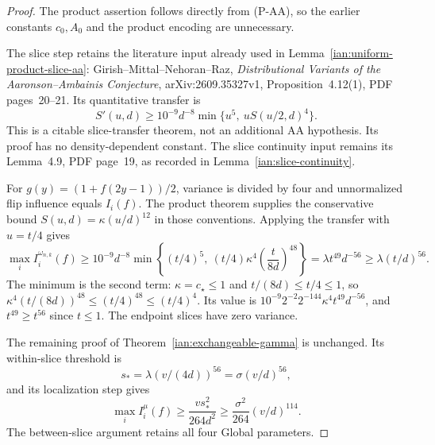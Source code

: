 \begin{proof}
The product assertion follows directly from (P-AA), so the earlier
constants \(c_0,A_0\) and the product encoding are unnecessary.

The slice step retains the literature input already used in
Lemma~\ref{ian:uniform-product-slice-aa}:
Girish--Mittal--Nehoran--Raz, \emph{Distributional Variants of the
Aaronson--Ambainis Conjecture}, arXiv:2609.35327v1,
Proposition~4.12(1), PDF pages~20--21.
Its quantitative transfer is
\[
 S'(u,d)\ge10^{-9}d^{-8}
             \min\{u^5,\ uS(u/2,d)^4\}.
\]
This is a citable slice-transfer theorem, not an additional AA
hypothesis. Its proof has no density-dependent constant.
The slice continuity input remains its Lemma~4.9, PDF page~19,
as recorded in Lemma~\ref{ian:slice-continuity}.

For \(g(y)=(1+f(2y-1))/2\), variance is divided by four and
unnormalized flip influence equals \(I_i(f)\).
The product theorem supplies the conservative bound
\(S(u,d)=\kappa(u/d)^{12}\) in those conventions. Applying the
transfer with \(u=t/4\) gives
\[
 \max_i I_i^{\omega_{n,k}}(f)
 \ge10^{-9}d^{-8}
 \min\left\{(t/4)^5,\
       (t/4)\kappa^4\left(\frac{t}{8d}\right)^{48}\right\}
 =\lambda t^{49}d^{-56}
 \ge\lambda(t/d)^{56}.
\]
The minimum is the second term: \(\kappa=c_\star\le1\) and
\(t/(8d)\le t/4\le1\), so
\(\kappa^4(t/(8d))^{48}\le(t/4)^{48}\le(t/4)^4\).
Its value is \(10^{-9}2^{-2}2^{-144}\kappa^4t^{49}d^{-56}\), and
\(t^{49}\ge t^{56}\) since \(t\le1\).
The endpoint slices have zero variance.

The remaining proof of Theorem~\ref{ian:exchangeable-gamma} is
unchanged. Its within-slice threshold is
\[
 s_*=\lambda(v/(4d))^{56}=\sigma(v/d)^{56},
\]
and its localization step gives
\[
 \max_i I_i^\mu(f)
 \ge\frac{v s_*^2}{264d^2}
 \ge\frac{\sigma^2}{264}(v/d)^{114}.
\]
The between-slice argument retains all four Global parameters.
\end{proof}

